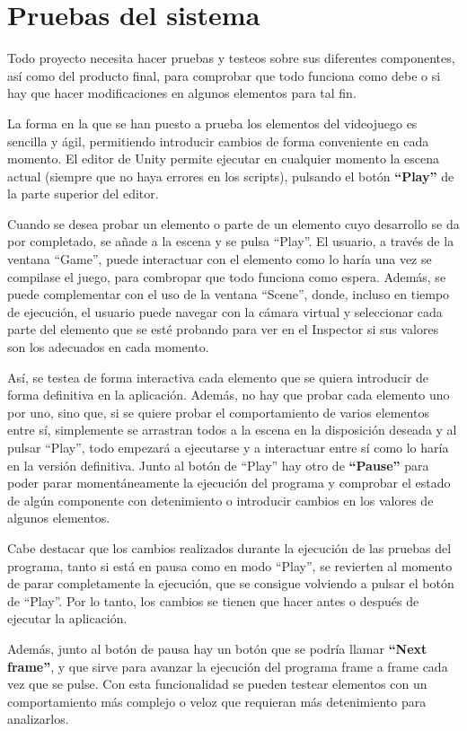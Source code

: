 \section{Pruebas del sistema}
Todo proyecto necesita hacer pruebas y testeos sobre sus diferentes componentes, así como del producto final, para comprobar que todo funciona como debe o si hay que hacer modificaciones en algunos elementos para tal fin.

La forma en la que se han puesto a prueba los elementos del videojuego es sencilla y ágil, permitiendo introducir cambios de forma conveniente en cada momento.
El editor de Unity permite ejecutar en cualquier momento la escena actual (siempre que no haya errores en los scripts), pulsando el botón \textbf{``Play''} de la parte superior del editor. 

Cuando se desea probar un elemento o parte de un elemento cuyo desarrollo se da por completado, se añade a la escena y se pulsa ``Play''. El usuario, a través de la ventana ``Game'', puede interactuar con el elemento como lo haría una vez se compilase el juego, para combropar que todo funciona como espera. Además, se puede complementar con el uso de la ventana ``Scene'', donde, incluso en tiempo de ejecución, el usuario puede navegar con la cámara virtual y seleccionar cada parte del elemento que se esté probando para ver en el Inspector si sus valores son los adecuados en cada momento.

Así, se testea de forma interactiva cada elemento que se quiera introducir de forma definitiva en la aplicación. Además, no hay que probar cada elemento uno por uno, sino que, si se quiere probar el comportamiento de varios elementos entre sí, simplemente se arrastran todos a la escena en la disposición deseada y al pulsar ``Play'', todo empezará a ejecutarse y a interactuar entre sí como lo haría en la versión definitiva.
Junto al botón de ``Play'' hay otro de \textbf{``Pause''} para poder parar momentáneamente la ejecución del programa y comprobar el estado de algún componente con detenimiento o introducir cambios en los valores de algunos elementos.

Cabe destacar que los cambios realizados durante la ejecución de las pruebas del programa, tanto si está en pausa como en modo ``Play'', se revierten al momento de parar completamente la ejecución, que se consigue volviendo a pulsar el botón de ``Play''. Por lo tanto, los cambios se tienen que hacer antes o después de ejecutar la aplicación.

Además, junto al botón de pausa hay un botón que se podría llamar \textbf{``Next frame''}, y que sirve para avanzar la ejecución del programa frame a frame cada vez que se pulse. Con esta funcionalidad se pueden testear elementos con un comportamiento más complejo o veloz que requieran más detenimiento para analizarlos.
 
